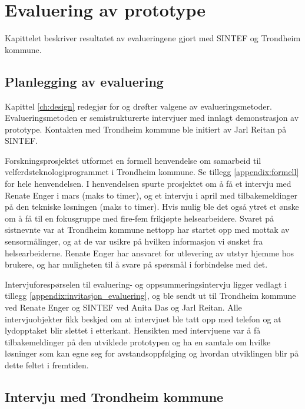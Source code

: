 \chapter{Evaluering av prototype}
\label{ch:evaluation1}
Kapittelet beskriver resultatet av evalueringene gjort med SINTEF og Trondheim kommune.

\section{Planlegging av evaluering}
Kapittel \ref{ch:design} redegjør for og drøfter valgene av evalueringsmetoder.
Evalueringsmetoden er semistrukturerte intervjuer med innlagt demonstrasjon av prototype.
Kontakten med Trondheim kommune ble initiert av Jarl Reitan på SINTEF.

Forskningsprosjektet utformet en formell henvendelse om samarbeid til velferdsteknologiprogrammet i Trondheim kommune.
Se tillegg \ref{appendix:formell} for hele henvendelsen. I henvendelsen spurte prosjektet om å få et intervju med Renate Enger i mars
(maks to timer), og et intervju i april med tilbakemeldinger på den tekniske løsningen (maks to timer). Hvis mulig ble det også
ytret et ønske om å få til en fokusgruppe med fire-fem frikjøpte helsearbeidere. Svaret på sistnevnte var at Trondheim kommune
nettopp har startet opp med mottak av sensormålinger, og at de var usikre på hvilken informasjon vi ønsket fra helsearbeiderne.
Renate Enger har ansvaret for utlevering av utstyr hjemme hos brukere, og har muligheten til å svare på spørsmål i forbindelse med det.

Intervjuforespørselen til evaluering- og oppsummeringsintervju ligger vedlagt i tillegg \ref{appendix:invitasjon_evaluering},
og ble sendt ut til Trondheim kommune ved Renate Enger og SINTEF ved Anita Das og Jarl Reitan. Alle intervjuobjekter fikk beskjed
om at intervjuet ble tatt opp med telefon og at lydopptaket blir slettet i etterkant. Hensikten med intervjuene var å få tilbakemeldinger
på den utviklede prototypen og ha en samtale om hvilke løsninger som kan egne seg for avstandsoppfølging og hvordan utviklingen blir
på dette feltet i fremtiden.

\section{Intervju med Trondheim
kommune}\label{intervju-med-trondheim-kommune}


